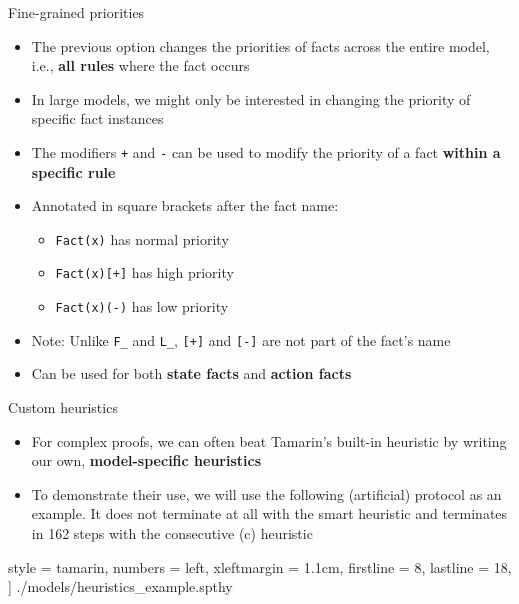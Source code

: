 \documentclass[11pt,aspectratio=169]{beamer}
\begin{document}
\begin{frame}[fragile]{Fine-grained priorities}
    \begin{itemize}
        \item The previous option changes the priorities of facts across the 
              entire  model, i.e., \textbf{all rules} where the fact occurs
        \item In large models, we might only be interested in changing the 
              priority of specific fact instances
        \item The modifiers \verb|+| and \verb|-| can be used to modify the 
              priority of a fact \textbf{within a specific rule}
        \item Annotated in square brackets after the fact name:
        \begin{itemize}
            \item[] \verb|Fact(x)| has normal priority
            \item[] \verb|Fact(x)[+]| has high priority
            \item[] \verb|Fact(x)(-)| has low priority
        \end{itemize}
        \item Note: Unlike \verb|F_| and \verb|L_|, \verb|[+]| and \verb|[-]| 
              are not part of the fact's name
        \item Can be used for both \textbf{state facts} and
              \textbf{action facts}
    \end{itemize}
\end{frame}

\begin{frame}[fragile,t]{Custom heuristics}
    \begin{itemize}
        \item For complex proofs, we can often beat Tamarin's built-in 
              heuristic by writing our own, \textbf{model-specific heuristics}
        \item To demonstrate their use, we will use the following (artificial) 
              protocol as an example. It does not terminate at all with the 
              smart heuristic and terminates in 162 steps with the consecutive 
              (c) heuristic
    \end{itemize}
    \vspace*{.25cm}
    
        style = tamarin,
        numbers = left,
        xleftmargin = 1.1cm,
        firstline = 8,
        lastline = 18,
    ] {./models/heuristics_example.spthy}
\end{frame}
\end{document}
